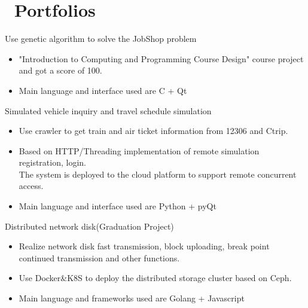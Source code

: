 \documentclass{resume}
\newcommand{\en}[1]{#1}
\newcommand{\zh}[1]{}
\begin{document}
\section{\faGithubAlt\ \en{Portfolios}\zh{个人项目}}
\en{Use genetic algorithm to solve the JobShop problem}
\zh{使用遗传算法解决jobshop问题}
\begin{itemize}
      \item \en{"Introduction to Computing and Programming Course Design" course project and  got a score of 100.}
            \zh{《计算导论与程序设计课程设计》课程项目 成绩100}
      \item \en{Main language and interface used are C + Qt}
            \zh{语言和界面为 C + Qt}
\end{itemize}

\en{Simulated vehicle inquiry and travel schedule simulation}
\zh{模拟交通工具查询与旅游进度模拟}
\begin{itemize}
      \item \en{Use crawler to get train and air ticket information from 12306 and Ctrip.}
            \zh{使用爬虫从12306、携程爬取车票、机票信息}
      \item \en{Based on HTTP/Threading implementation of remote simulation registration, login. \\
      The system is deployed to the cloud platform to support remote concurrent access.}
            \zh{基于http/threading实现远程模拟注册、登录。系统部署到云平台，支持远程并发访问。}
      \item \en{Main language and interface used are Python + pyQt}
            \zh{语言和界面为 Python + pyQt}
\end{itemize}

\en{Distributed network disk(Graduation Project)}
\zh{\role{分布式网络云盘}{毕业设计}}
\begin{itemize}
      \item \en{Realize network disk fast transmission, block uploading, break point continued transmission and other functions.}
            \zh{实现网盘快传、分块上传、断点续传等功能}
      \item \en{Use Docker\&K8S to deploy the distributed storage cluster based on Ceph.}
            \zh{使用Docker、K8S基于Ceph部署分布式存储集群}

      \item \en{Main language and   frameworks used are Golang + Javascript}
            \zh{语言和界面为 Golang + Javascript}
\end{itemize}
\end{document}
